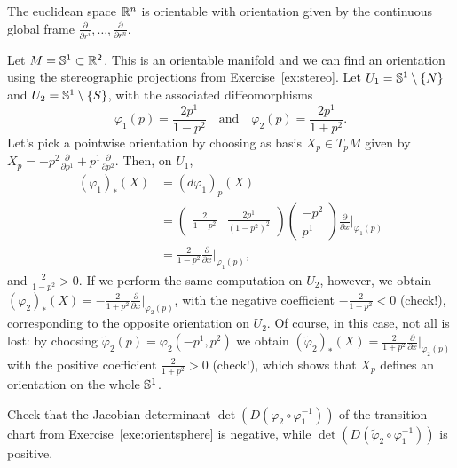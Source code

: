 \begin{example}
  The euclidean space $\mathbb{R}^n$ is orientable with orientation given by the continuous global frame $\frac{\partial}{\partial r^i},\ldots,\frac{\partial}{\partial r^n}$.
\end{example}

\begin{example}\label{exe:orientsphere}
  Let $M = \mathbb{S}^1\subset \mathbb{R}^2$.
  This is an orientable manifold and we can find an orientation using the stereographic projections from Exercise~\ref{ex:stereo}.
  Let $U_1 = \mathbb{S}^1\setminus\{N\}$ and $U_2 = \mathbb{S}^1\setminus\{S\}$, with the associated diffeomorphisms
  \begin{equation}
    \varphi_1(p) = \frac{2p^1}{1-p^2}
    \quad\mbox{and}\quad
    \varphi_2(p) = \frac{2p^1}{1+p^2}.
  \end{equation}
  Let's pick a pointwise orientation by choosing as basis $X_p\in T_pM$ given by $X_p = -p^2 \frac{\partial}{\partial p^1} + p^1 \frac{\partial}{\partial p^2}$.
  Then, on $U_1$,
  \begin{align}
    (\varphi_1)_*(X) &= (d\varphi_1)_p(X) \\
    &= \left(\begin{smallmatrix}
      \frac{2}{1-p^2} & \frac{2p^1}{(1-p^2)^2}
    \end{smallmatrix}\right)
    \left(\begin{smallmatrix}
      -p^2 \\ p^1
    \end{smallmatrix}\right) \frac{\partial}{\partial x}\Big|_{\varphi_1(p)}\\
    &= \frac{2}{1-p^2} \frac{\partial}{\partial x}\Big|_{\varphi_1(p)},
  \end{align}
  and $\frac{2}{1-p^2}>0$.
  If we perform the same computation on $U_2$, however, we obtain $(\varphi_2)_*(X) = -\frac{2}{1+p^2}\frac{\partial}{\partial x}\Big|_{\varphi_2(p)}$, with the negative coefficient $-\frac{2}{1+p^2} < 0$ (check!), corresponding to the opposite orientation on $U_2$.
  Of course, in this case, not all is lost: by choosing $\widetilde\varphi_2(p) = \varphi_2(-p^1, p^2)$ we obtain $(\widetilde\varphi_2)_*(X) = \frac{2}{1+p^2} \frac{\partial}{\partial x}\Big|_{\widetilde\varphi_2(p)}$ with the positive coefficient $\frac{2}{1+p^2} > 0$ (check!), which shows that $X_p$ defines an orientation on the whole $\mathbb{S}^1$.
\end{example}

\begin{exercise}
  Check that the Jacobian determinant $\det(D(\varphi_2\circ \varphi_1^{-1}))$ of the transition chart from Exercise~\ref{exe:orientsphere} is negative, while $\det(D(\widetilde\varphi_2\circ \varphi_1^{-1}))$ is positive.
\end{exercise}

